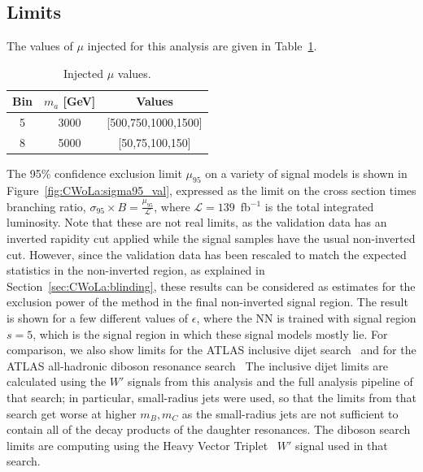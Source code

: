 \FloatBarrier
\subsection{Limits}
\label{sec:CWoLa:inverted:statisticalanalysis}

The values of $\mu$ injected for this analysis are given in Table~\ref{tab:inverted:injectedmu}.

\begin{table}[htb]
  \centering
  \caption{Injected $\mu$ values.}
  \label{tab:inverted:injectedmu}
  \begin{tabular}{c c c}
    \hline
    Bin & $m_a$ [GeV] & Values \\ \hline
    5 & 3000 & [500,750,1000,1500] \\
    8 & 5000 & [50,75,100,150] \\
    \hline
  \end{tabular}
\end{table} 

The 95\% confidence exclusion limit $\mu_{95}$ on a variety of signal models is shown in Figure~\ref{fig:CWoLa:sigma95_val}, expressed as the limit on the cross section times branching ratio, $\sigma_{95}\times B = \frac{\mu_{95}}{\mathcal{L}}$, where $\mathcal{L} = 139$~fb$^{-1}$ is the total integrated luminosity.
Note that these are not real limits, as the validation data has an inverted rapidity cut applied while the signal samples have the usual non-inverted cut.
However, since the validation data has been rescaled to match the expected statistics in the non-inverted region, as explained in Section~\ref{sec:CWoLa:blinding}, these results can be considered as estimates for the exclusion power of the method in the final non-inverted signal region.
The result is shown for a few different values of $\epsilon$, where the NN is trained with signal region $s=5$, which is the signal region in which these signal models mostly lie.
For comparison, we also show limits for the ATLAS inclusive dijet search~\cite{Aad:2019hjw} and for the ATLAS all-hadronic diboson resonance search~\cite{Aad:2019fbh}
The inclusive dijet limits are calculated using the $W'$ signals from this analysis and the full analysis pipeline of that search;
in particular, small-radius jets were used, so that the limits from that search get worse at higher $m_B,m_C$ as the small-radius jets are not sufficient to contain all of the decay products of the daughter resonances.
The diboson search limits are computing using the Heavy Vector Triplet~\cite{Pappadopulo:2014qza} $W'$ signal used in that search.


